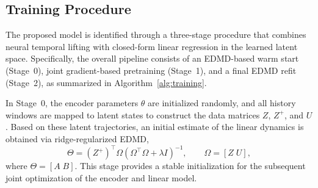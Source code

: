 \documentclass[journal]{IEEEtran}
\begin{document}
\subsection{Training Procedure}
\label{sec:training}

The proposed model is identified through a three-stage procedure that combines neural temporal lifting with closed-form linear regression in the learned latent space. Specifically, the overall pipeline consists of an EDMD-based warm start (Stage~0), joint gradient-based pretraining (Stage~1), and a final EDMD refit (Stage~2), as summarized in Algorithm~\ref{alg:training}.

In Stage~0, the encoder parameters $\theta$ are initialized randomly, and all history windows are mapped to latent states to construct the data matrices $Z$, $Z^{+}$, and $U$. Based on these latent trajectories, an initial estimate of the linear dynamics is obtained via ridge-regularized EDMD,
\begin{equation}
    \Theta = (Z^{+})^\top \Omega \left(\Omega^\top \Omega + \lambda I\right)^{-1},
    \qquad
    \Omega = [Z\;U],
    \label{eq:edmd_solution}
\end{equation}
where $\Theta = [A\;B]$. This stage provides a stable initialization for the subsequent joint optimization of the encoder and linear model.
\end{document}
